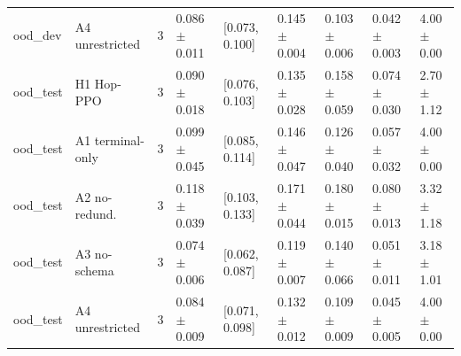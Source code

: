 \begin{tabular}{lllllllll}
ood\_dev & A4 unrestricted & 3 & 0.086$\pm$0.011 & [0.073, 0.100] & 0.145$\pm$0.004 & 0.103$\pm$0.006 & 0.042$\pm$0.003 & 4.00$\pm$0.00 \\
ood\_test & H1 Hop-PPO & 3 & 0.090$\pm$0.018 & [0.076, 0.103] & 0.135$\pm$0.028 & 0.158$\pm$0.059 & 0.074$\pm$0.030 & 2.70$\pm$1.12 \\
ood\_test & A1 terminal-only & 3 & 0.099$\pm$0.045 & [0.085, 0.114] & 0.146$\pm$0.047 & 0.126$\pm$0.040 & 0.057$\pm$0.032 & 4.00$\pm$0.00 \\
ood\_test & A2 no-redund. & 3 & 0.118$\pm$0.039 & [0.103, 0.133] & 0.171$\pm$0.044 & 0.180$\pm$0.015 & 0.080$\pm$0.013 & 3.32$\pm$1.18 \\
ood\_test & A3 no-schema & 3 & 0.074$\pm$0.006 & [0.062, 0.087] & 0.119$\pm$0.007 & 0.140$\pm$0.066 & 0.051$\pm$0.011 & 3.18$\pm$1.01 \\
ood\_test & A4 unrestricted & 3 & 0.084$\pm$0.009 & [0.071, 0.098] & 0.132$\pm$0.012 & 0.109$\pm$0.009 & 0.045$\pm$0.005 & 4.00$\pm$0.00 \\
\bottomrule
\end{tabular}
